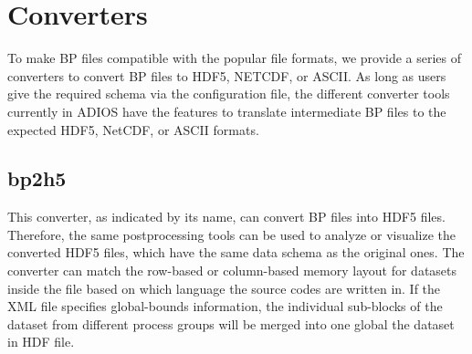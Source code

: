 \chapter{Converters}

To make BP files compatible with the popular file formats, we provide a series 
of converters to convert BP files to HDF5, NETCDF, or ASCII. As long as users give 
the required schema via the configuration file, the different converter tools currently 
in ADIOS have the features to translate intermediate BP files to the expected HDF5, 
NetCDF, or ASCII formats.

\section{bp2h5}

This converter, as indicated by its name, can convert BP files into HDF5 files. 
Therefore, the same postprocessing tools can be used to analyze or visualize the 
converted HDF5 files, which have the same data schema as the original ones. The 
converter can match the row-based or column-based memory layout for datasets inside 
the file based on which language the source codes are written in.  If the XML file 
specifies global-bounds information, the individual sub-blocks of the dataset from 
different process groups will be merged into one global the dataset in HDF file.

%
%


